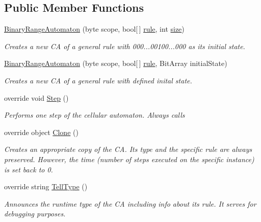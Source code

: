 \subsection*{Public Member Functions}
\begin{DoxyCompactItemize}
\item 
\hyperlink{class_cellular_1_1_binary_range_automaton_a3b165a9e98e516bf7e9bdb8bb2fe16a7}{Binary\+Range\+Automaton} (byte scope, bool\mbox{[}$\,$\mbox{]} \hyperlink{class_cellular_1_1_binary_range_automaton_a4dda99c3151599c8ef12d08d7472144c}{rule}, int \hyperlink{class_cellular_1_1_automaton1_d_a915129ccf0f1e7092844c99ce6a28e5b}{size})
\begin{DoxyCompactList}\small\item\em Creates a new C\+A of a general rule with 000...00100...000 as its initial state. \end{DoxyCompactList}\item 
\hyperlink{class_cellular_1_1_binary_range_automaton_a704950c30ff58c587c8a717f9f2c839b}{Binary\+Range\+Automaton} (byte scope, bool\mbox{[}$\,$\mbox{]} \hyperlink{class_cellular_1_1_binary_range_automaton_a4dda99c3151599c8ef12d08d7472144c}{rule}, Bit\+Array initial\+State)
\begin{DoxyCompactList}\small\item\em Creates a new C\+A of a general rule with defined inital state. \end{DoxyCompactList}\item 
override void \hyperlink{class_cellular_1_1_binary_range_automaton_ade1f5b831b9676f04f835c33d245b9e2}{Step} ()
\begin{DoxyCompactList}\small\item\em Performs one step of the cellular automaton. Always calls \end{DoxyCompactList}\item 
override object \hyperlink{class_cellular_1_1_binary_range_automaton_a12f010562e04785e0a7efb113302687e}{Clone} ()
\begin{DoxyCompactList}\small\item\em Creates an appropriate copy of the C\+A. Its type and the specific rule are always preserved. However, the time (number of steps executed on the specific instance) is set back to 0. \end{DoxyCompactList}\item 
override string \hyperlink{class_cellular_1_1_binary_range_automaton_afad205eb4fea51efd63b063f96bfda5c}{Tell\+Type} ()
\begin{DoxyCompactList}\small\item\em Announces the runtime type of the C\+A including info about its rule. It serves for debugging purposes. \end{DoxyCompactList}\end{DoxyCompactItemize}
